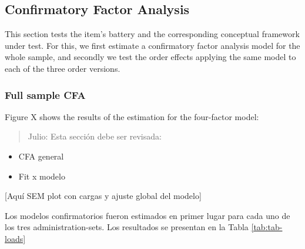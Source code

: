 \documentclass[
]{article}
\providecommand{\tightlist}{%
  \setlength{\itemsep}{0pt}\setlength{\parskip}{0pt}}
\begin{document}
\hypertarget{confirmatory-factor-analysis}{%
\subsection{Confirmatory Factor Analysis}\label{confirmatory-factor-analysis}}

This section tests the item's battery and the corresponding conceptual framework under test. For this, we first estimate a confirmatory factor analysis model for the whole sample, and secondly we test the order effects applying the same model to each of the three order versions.

\hypertarget{full-sample-cfa}{%
\subsubsection{Full sample CFA}\label{full-sample-cfa}}

Figure X shows the results of the estimation for the four-factor model:

\begin{quote}
Julio: Esta sección debe ser revisada:
\end{quote}

\begin{itemize}
\tightlist
\item
  CFA general
\item
  Fit x modelo
\end{itemize}

{[}Aquí SEM plot con cargas y ajuste global del modelo{]}

Los modelos confirmatorios fueron estimados en primer lugar para cada uno de los tres administration-sets. Los resultados se presentan en la Tabla \ref{tab:tab-loads}
\end{document}
